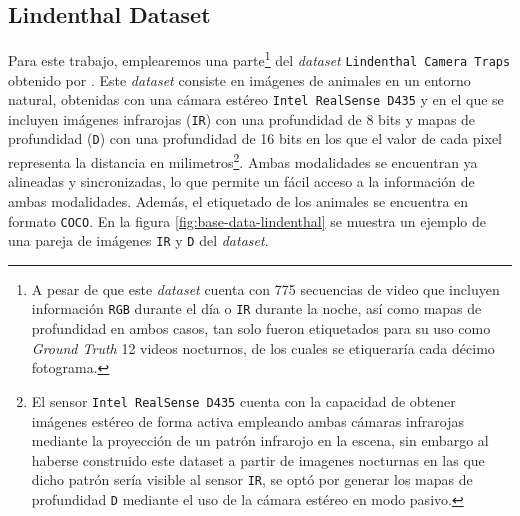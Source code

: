 \documentclass[12pt,a4paper]{report}
\begin{document}
\subsection{Lindenthal Dataset}
\label{subsec:lindenthal_dataset}
Para este trabajo, emplearemos una parte\footnote{A pesar de que este \textit{dataset} cuenta con 775 secuencias de video que incluyen información \texttt{RGB} durante el día o \texttt{IR} durante la noche, así como mapas de profundidad en ambos casos, tan solo fueron etiquetados para su uso como \textit{Ground Truth} 12 videos nocturnos, de los cuales se etiqueraría cada décimo fotograma.} del \textit{dataset} \texttt{Lindenthal Camera Traps} obtenido por \cite{haucke2021exploitingdepthinformationwildlife}. Este \textit{dataset} consiste en imágenes de animales en un entorno natural, obtenidas con una cámara estéreo \texttt{Intel RealSense D435} y en el que se incluyen imágenes infrarojas (\texttt{IR}) con una profundidad de 8 bits y mapas de profundidad (\texttt{D}) con una profundidad de 16 bits en los que el valor de cada pixel representa la distancia en milimetros\footnote{El sensor \texttt{Intel RealSense D435} cuenta con la capacidad de obtener imágenes estéreo de forma activa empleando ambas cámaras infrarojas mediante la proyección de un patrón infrarojo en la escena, sin embargo al haberse construido este dataset a partir de imagenes nocturnas en las que dicho patrón sería visible al sensor \texttt{IR}, se optó por generar los mapas de profundidad \texttt{D} mediante el uso de la cámara estéreo en modo pasivo.}. Ambas modalidades se encuentran ya alineadas y sincronizadas, lo que permite un fácil acceso a la información de ambas modalidades. Además, el etiquetado de los animales se encuentra en formato \texttt{COCO}. En la figura \ref{fig:base-data-lindenthal} se muestra un ejemplo de una pareja de imágenes \texttt{IR} y \texttt{D} del \textit{dataset}.
\end{document}
